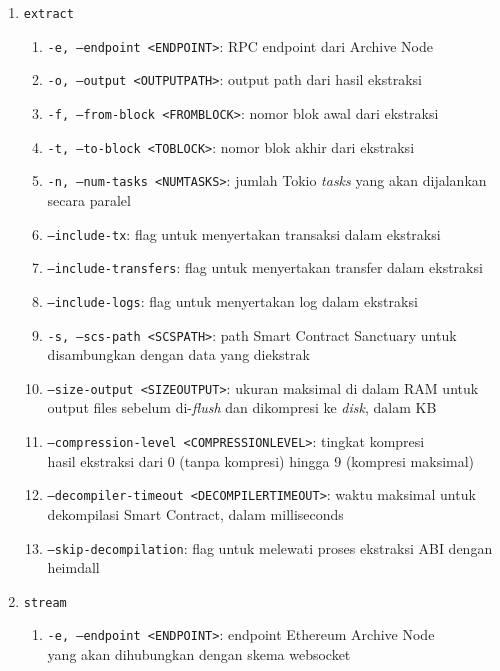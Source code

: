 \begin{enumerate}
	\item \texttt{extract}
	      \begin{enumerate}
		      \item \texttt{-e, --endpoint <ENDPOINT>}: RPC endpoint dari Archive Node
		      \item \texttt{-o, --output <OUTPUT\textunderscore PATH>}: output path dari hasil ekstraksi
		      \item \texttt{-f, --from-block <FROM\textunderscore BLOCK>}: nomor blok awal dari ekstraksi
		      \item \texttt{-t, --to-block <TO\textunderscore BLOCK>}: nomor blok akhir dari ekstraksi
		      \item \texttt{-n, --num-tasks <NUM\textunderscore TASKS>}: jumlah Tokio \textit{tasks} yang akan dijalankan secara paralel
		      \item \texttt{--include-tx}: flag untuk menyertakan transaksi dalam ekstraksi
		      \item \texttt{--include-transfers}: flag untuk menyertakan transfer dalam ekstraksi
		      \item \texttt{--include-logs}: flag untuk menyertakan log dalam ekstraksi
		      \item \texttt{-s, --scs-path <SCS\textunderscore PATH>}: path Smart Contract Sanctuary untuk disambungkan dengan data yang diekstrak
		      \item \texttt{--size-output <SIZE\textunderscore OUTPUT>}: ukuran maksimal di dalam RAM untuk output files sebelum di-\textit{flush} dan dikompresi ke \textit{disk}, dalam KB
		      \item \texttt{--compression-level <COMPRESSION\textunderscore LEVEL>}: tingkat kompresi \\hasil ekstraksi dari 0 (tanpa kompresi) hingga 9 (kompresi maksimal)
		      \item \texttt{--decompiler-timeout <DECOMPILER\textunderscore TIMEOUT>}: waktu maksimal untuk dekompilasi Smart Contract, dalam milliseconds
		      \item \texttt{--skip-decompilation}: flag untuk melewati proses ekstraksi ABI dengan heimdall
	      \end{enumerate}
	\item \texttt{stream}
	      \begin{enumerate}
		      \item \texttt{-e, --endpoint <ENDPOINT>}: endpoint Ethereum Archive Node \\yang akan dihubungkan dengan skema websocket

\end{enumerate}
\end{enumerate}
